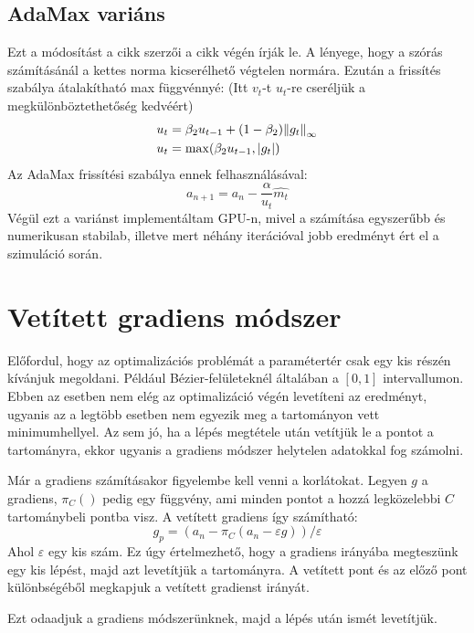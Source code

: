 \subsection{AdaMax variáns}
Ezt a módosítást a cikk \cite{Adam} szerzői a cikk végén írják le. A lényege, hogy a szórás számításánál a kettes norma kicserélhető végtelen normára. Ezután a frissítés szabálya átalakítható max függvénnyé: (Itt $v_t$-t $u_t$-re cseréljük a megkülönböztethetőség kedvéért)
\begin{align*} 
	u_t &= \beta_2 u_{t-1} + (1-\beta_2)\norm{g_t}_\infty \\ 
	u_t &= \max (\beta_2 u_{t-1}, |g_t|)
\end{align*}
Az AdaMax frissítési szabálya ennek felhasználásával:
$$ a_{n+1} = a_n - \frac{\alpha}{u_t}\hat{m_t} $$
Végül ezt a variánst implementáltam GPU-n, mivel a számítása egyszerűbb és numerikusan stabilab, illetve mert néhány iterációval jobb eredményt ért el a szimuláció során. 


\section{Vetített gradiens módszer}

Előfordul, hogy az optimalizációs problémát a paramétertér csak egy kis részén kívánjuk megoldani. Például Bézier-felületeknél általában a $[0,1]$ intervallumon. Ebben az esetben nem elég az optimalizáció végén levetíteni az eredményt, ugyanis az a legtöbb esetben nem egyezik meg a tartományon vett minimumhellyel. \cite{MirrorDescent} Az sem jó, ha a lépés megtétele után vetítjük le a pontot a tartományra, ekkor ugyanis a gradiens módszer helytelen adatokkal fog számolni. 

Már a gradiens számításakor figyelembe kell venni a korlátokat. Legyen $g$ a gradiens, $\pi_C()$ pedig egy függvény, ami minden pontot a hozzá legközelebbi $C$ tartománybeli pontba visz. A vetített gradiens így számítható:
$$ g_p = (a_n - \pi_C(a_n-\varepsilon g))/\varepsilon $$
Ahol $\varepsilon$ egy kis szám. Ez úgy értelmezhető, hogy a gradiens irányába megteszünk egy kis lépést, majd azt levetítjük a tartományra. A vetített pont és az előző pont különbségéből megkapjuk a vetített gradienst irányát.

Ezt odaadjuk a gradiens módszerünknek, majd a lépés után ismét levetítjük. 




